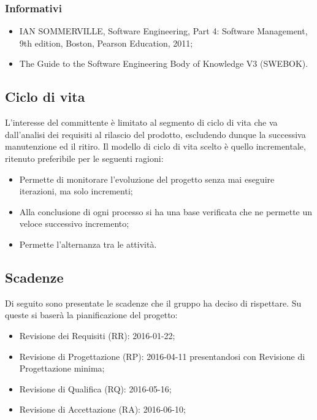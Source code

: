 \subsubsection{Informativi}
\begin{itemize}
\item IAN SOMMERVILLE, Software Engineering, Part 4: Software Management, 9th edition, Boston, Pearson Education, 2011;
\item The Guide to the Software Engineering Body of Knowledge V3 (SWEBOK).
\end{itemize}

\subsection{Ciclo di vita}
L’interesse del committente è limitato al segmento di ciclo di vita che va dall’analisi dei requisiti al
rilascio del prodotto, escludendo dunque la successiva manutenzione ed il ritiro. Il modello di ciclo di
vita scelto \`e quello incrementale, ritenuto preferibile per le seguenti ragioni:
\begin{itemize}
\item Permette di monitorare l'evoluzione del progetto senza mai eseguire iterazioni, ma solo incrementi;
\item Alla conclusione di ogni processo si ha una base verificata che ne permette un veloce successivo incremento;
\item Permette l'alternanza tra le attivit\`a.
\end{itemize}

\subsection{Scadenze}
Di seguito sono presentate le scadenze che il gruppo ha deciso di rispettare. Su queste si baserà la pianificazione del progetto:
\begin{itemize}
\item Revisione dei Requisiti (RR): 2016-01-22;
\item Revisione di Progettazione (RP): 2016-04-11 presentandosi con Revisione di Progettazione minima; 
\item Revisione di Qualifica (RQ): 2016-05-16;
\item Revisione di Accettazione (RA): 2016-06-10;
\end{itemize}

